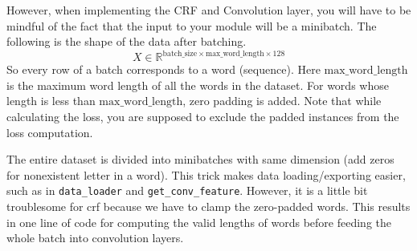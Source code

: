 \documentclass[11pt]{report}
\begin{document}
However, when implementing the CRF and Convolution layer, you will have to be
mindful of the fact that the input to your module will be a minibatch. The
following is the shape of the data after batching.
%
\begin{equation}
  X \in \mathbb{R}^{ \text{batch\_size} \times \text{max\_word\_length} \times 128}
\end{equation}
%
So every row of a batch corresponds to a word (sequence). Here
$\text{max\_word\_length}$ is the maximum word length of all the words in the
dataset. For words whose length is less than $\text{max\_word\_length}$, zero
padding is added. Note that while calculating the loss, you are supposed to exclude the padded instances from the loss computation.

The entire dataset is divided into minibatches with same dimension (add zeros for nonexistent letter in a word). This trick makes data loading/exporting easier, such as in \verb#data_loader# and \verb#get_conv_feature#. However, it is a little bit troublesome for crf because we have to clamp the zero-padded words. This results in one line of code for computing the valid lengths of words before feeding the whole batch into convolution layers.\\




\end{document}
